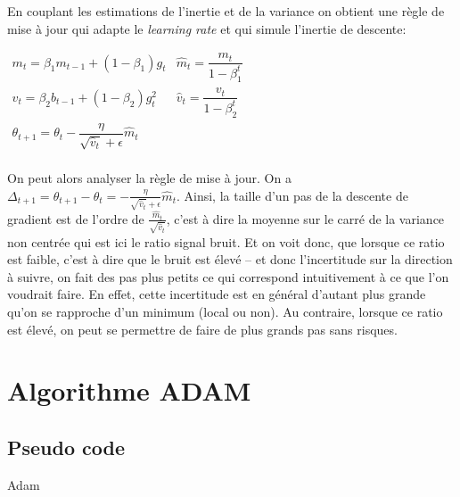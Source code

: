 \documentclass[fleqn,11pt, titlepage, french]{article}
\begin{document}
	En couplant les estimations de l'inertie et de la variance on obtient une règle de mise à jour qui adapte le \emph{learning rate} et qui simule l'inertie de descente:
	\begin{center}
	$
		\begin{array}{ll}
		m_t = \beta_1 m_{t-1} + (1-\beta_1) g_t & \hat{m}_t = \dfrac{m_t}{1 - \beta^t_1} \\
		v_t = \beta_2 b_{t-1} +  (1-\beta_2)g_t^2 & \hat{v}_t = \dfrac{v_t}{1 - \beta^t_2} \\
		
		\theta_{t+1} = \theta_{t} - \dfrac{\eta}{\sqrt{\hat{v}_t} + \epsilon} \hat{m}_t & \\
		\end{array}
	$
	\end{center}

	On peut alors analyser la règle de mise à jour. On a $\Delta_{t+1} = \theta_{t+1} - \theta_{t} = - \frac{\eta}{\sqrt{\hat{v}_t} + \epsilon} \hat{m}_t$. Ainsi, la taille d'un pas de la descente de gradient est de l'ordre de $\frac{\hat{m}_t}{\sqrt{\hat{v}_t}}$, c'est à dire la moyenne sur le carré de la variance non centrée qui est ici le ratio signal bruit. Et on voit donc, que lorsque ce ratio est faible, c'est à dire que le bruit est élevé -- et donc l'incertitude sur la direction à suivre, on fait des pas plus petits ce qui correspond intuitivement à ce que l'on voudrait faire. En effet, cette incertitude est en général d'autant plus grande qu'on se rapproche d'un minimum (local ou non). Au contraire, lorsque ce ratio est élevé, on peut se permettre de faire de plus grands pas sans risques.
	
	
	
	
	\section{Algorithme ADAM}
	\subsection{Pseudo code}
	\begin{algorithm}[H]
		\begin{algorithmic}
			
			
				
			\ENDWHILE
		\end{algorithmic}
	\caption{Adam}
	\end{algorithm}
\end{document}
